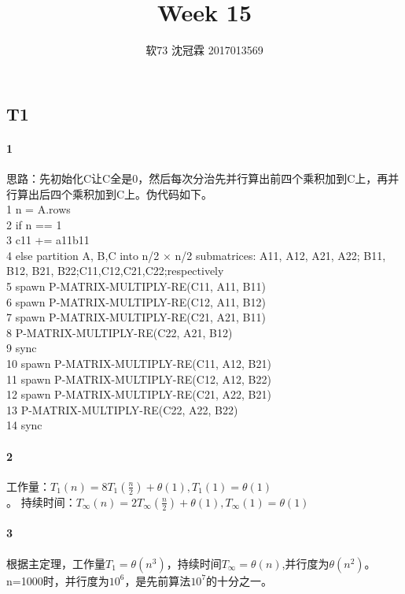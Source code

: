 \documentclass{article}
\title{Week 15}
\author{软73 沈冠霖 2017013569}
\begin{document}
\begin{CJK}{UTF8}{gkai}
\maketitle

\section{T1}
\paragraph{1}
思路：先初始化C让C全是0，然后每次分治先并行算出前四个乘积加到C上，再并行算出后四个乘积加到C上。伪代码如下。\\
1 n = A.rows\\
2 if n == 1\\
3 \qquad c11 += a11b11\\
4 else  partition A, B,C  into n/2 × n/2
submatrices: A11, A12, A21, A22;
B11, B12, B21, B22;C11,C12,C21,C22;respectively\\
5 \qquad spawn P-MATRIX-MULTIPLY-RE(C11, A11, B11)\\
6 \qquad spawn P-MATRIX-MULTIPLY-RE(C12, A11, B12)\\
7 \qquad spawn P-MATRIX-MULTIPLY-RE(C21, A21, B11)\\
8 \qquad P-MATRIX-MULTIPLY-RE(C22, A21, B12)\\
9  \qquad sync\\
10 \qquad spawn P-MATRIX-MULTIPLY-RE(C11, A12, B21)\\
11 \qquad spawn P-MATRIX-MULTIPLY-RE(C12, A12, B22)\\
12 \qquad spawn P-MATRIX-MULTIPLY-RE(C21, A22, B21)\\
13 \qquad P-MATRIX-MULTIPLY-RE(C22, A22, B22)\\
14 \qquad sync
\paragraph{2}
工作量：$T_{1}(n)=8T_{1}(\frac{n}{2})+\theta(1),T_{1}(1)=\theta(1)$\\。
持续时间：$T_{\infty}(n)=2T_{\infty}(\frac{n}{2})+\theta(1),T_{\infty}(1)=\theta(1)$\\
\paragraph{3}
根据主定理，工作量$T_{1}=\theta(n^{3})$，持续时间$T_{\infty}=\theta(n)$,并行度为$\theta(n^{2})$。\\
n=1000时，并行度为$10^{6}$，是先前算法$10^{7}$的十分之一。

\end{CJK}
\end{document}
